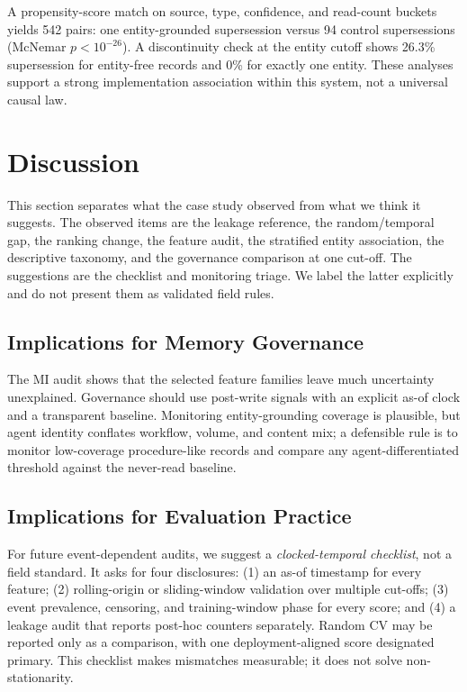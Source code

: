 \documentclass[sigconf,nonacm]{acmart}
\begin{document}
A propensity-score match on source, type, confidence, and read-count buckets yields 542 pairs: one entity-grounded supersession versus 94 control supersessions (McNemar $p<10^{-26}$). A discontinuity check at the entity cutoff shows 26.3\% supersession for entity-free records and 0\% for exactly one entity. These analyses support a strong implementation association within this system, not a universal causal law.
\section{Discussion}
\label{sec:discussion}

This section separates what the case study observed from what we think it suggests. The observed items are the leakage reference, the random/temporal gap, the ranking change, the feature audit, the stratified entity association, the descriptive taxonomy, and the governance comparison at one cut-off. The suggestions are the checklist and monitoring triage. We label the latter explicitly and do not present them as validated field rules.

\subsection{Implications for Memory Governance}
The MI audit shows that the selected feature families leave much uncertainty unexplained. Governance should use post-write signals with an explicit as-of clock and a transparent baseline. Monitoring entity-grounding coverage is plausible, but agent identity conflates workflow, volume, and content mix; a defensible rule is to monitor low-coverage procedure-like records and compare any agent-differentiated threshold against the never-read baseline.


\subsection{Implications for Evaluation Practice}
For future event-dependent audits, we suggest a \emph{clocked-temporal checklist}, not a field standard. It asks for four disclosures: (1) an as-of timestamp for every feature; (2) rolling-origin or sliding-window validation over multiple cut-offs; (3) event prevalence, censoring, and training-window phase for every score; and (4) a leakage audit that reports post-hoc counters separately. Random CV may be reported only as a comparison, with one deployment-aligned score designated primary. This checklist makes mismatches measurable; it does not solve non-stationarity.
\end{document}
